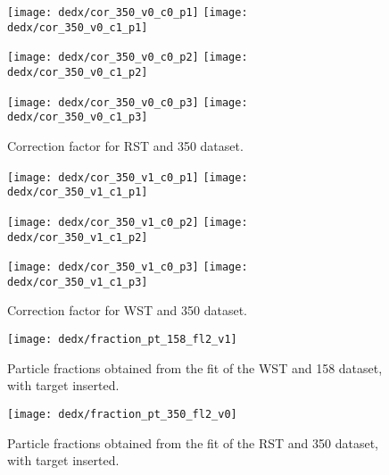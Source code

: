 \begin{figure}
  \centering
  \texttt{[image: dedx/cor\_350\_v0\_c0\_p1]}
  \texttt{[image: dedx/cor\_350\_v0\_c1\_p1]}

  \texttt{[image: dedx/cor\_350\_v0\_c0\_p2]}
  \texttt{[image: dedx/cor\_350\_v0\_c1\_p2]}

  \texttt{[image: dedx/cor\_350\_v0\_c0\_p3]}
  \texttt{[image: dedx/cor\_350\_v0\_c1\_p3]}

  \caption{Correction factor for RST and 350 \GeVc dataset.}
  \label{fig:hadron:dedx:fit:fake:cor350r}
\end{figure}

\begin{figure}
  \centering
  \texttt{[image: dedx/cor\_350\_v1\_c0\_p1]}
  \texttt{[image: dedx/cor\_350\_v1\_c1\_p1]}

  \texttt{[image: dedx/cor\_350\_v1\_c0\_p2]}
  \texttt{[image: dedx/cor\_350\_v1\_c1\_p2]}

  \texttt{[image: dedx/cor\_350\_v1\_c0\_p3]}
  \texttt{[image: dedx/cor\_350\_v1\_c1\_p3]}

  \caption{Correction factor for WST and 350 \GeVc dataset.}
  \label{fig:hadron:dedx:fit:fake:cor350w}
\end{figure}


\clearpage


\begin{figure}
  \centering
  \texttt{[image: dedx/fraction\_pt\_158\_fl2\_v1]}
  \caption{Particle fractions obtained from the \dedx fit of the WST and 158 \GeVc dataset, with target inserted.}
  \label{fig:hadron:dedx:fit:final158w}
\end{figure}

\begin{figure}
  \centering
  \texttt{[image: dedx/fraction\_pt\_350\_fl2\_v0]}
  \caption{Particle fractions obtained from the \dedx fit of the RST and 350 \GeVc dataset, with target inserted.}
  \label{fig:hadron:dedx:fit:final350r}
\end{figure}

